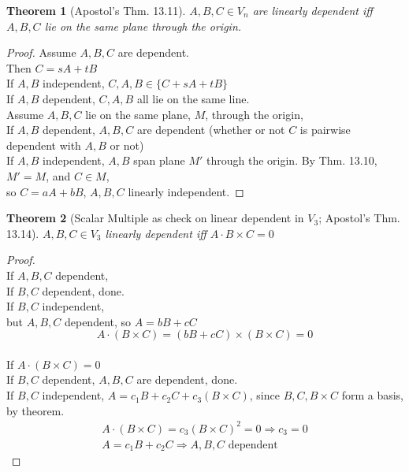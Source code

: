 \documentclass[twoside]{amsart}
\theoremstyle{plain}
\newtheorem{theorem}{Theorem}
\theoremstyle{definition}
\begin{document}
\begin{theorem}[Apostol's Thm. 13.11] $A,B,C \in V_n$ are linearly dependent iff $A,B,C$ lie on the same plane through the origin.
\end{theorem}
\begin{proof}
  Assume $A,B,C$ are dependent.  \\
  Then $C= sA + tB$ \\
  \quad If $A,B$ independent, $C,A,B \in \{ C + sA + tB \}$ \\
  \quad If $A,B$ dependent, $C,A,B$ all lie on the same line.   \medskip \\

Assume $A,B,C$ lie on the same plane, $M$, through the origin, \\
If $A,B$ dependent, $A,B,C$ are dependent (whether or not $C$ is pairwise dependent with $A,B$ or not) \\
If $A,B$ independent, $A,B$ span plane $M'$ through the origin.  By Thm. 13.10, $M' = M$, and $C \in M$, \\
\phantom{ If } so $C = aA + bB$, $A,B,C$ linearly independent.  
\end{proof}

\begin{theorem}[Scalar Multiple as check on linear dependent in $V_3$; Apostol's Thm. 13.14] 
$A,B,C \in V_3$ linearly dependent iff $A \cdot B \times C = 0$
\end{theorem}

\begin{proof} \quad \\
  If $A,B,C$ dependent, \\
  \quad If $B,C$ dependent, done.  \\
  \quad If $B,C$ independent, \\
  \quad \quad but $A,B,C$ dependent, so $A = bB + cC$
\[
A \cdot (B\times C) = (bB + cC ) \times (B\times C) = 0 
\]
\quad \\

\noindent If $A \cdot (B\times C) = 0$ \\
\quad If $B,C$ dependent, $A,B,C$ are dependent, done.  \\
\quad If $B,C$ independent, $A = c_1 B + c_2 C + c_3 (B\times C)$, since $B,C,B\times C$ form a basis, by theorem.  
\[
\begin{gathered}
  A \cdot (B\times C) = c_3 (B\times C)^2 = 0 \Longrightarrow c_3 = 0 \\
  A = c_1 B + c_2 C \Longrightarrow A,B,C \text{ dependent } 
\end{gathered}
\]
\end{proof}
\end{document}
